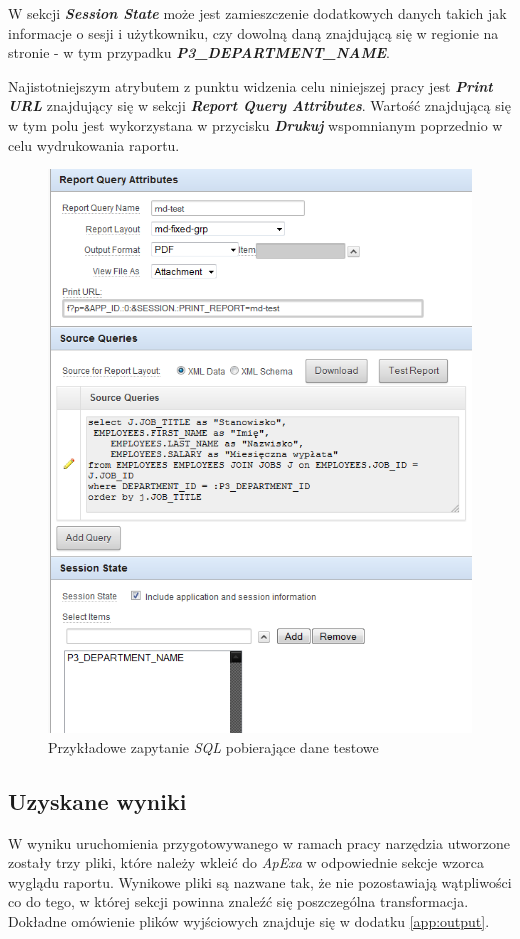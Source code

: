 \documentclass[11pt,a4paper]{article}
\begin{document}
W sekcji \textbf{\emph{Session State}} może jest zamieszczenie dodatkowych danych takich jak informacje o sesji i użytkowniku, czy dowolną daną znajdującą się w regionie na stronie - w tym przypadku \textbf{\emph{P3\_DEPARTMENT\_NAME}}. 

Najistotniejszym atrybutem z punktu widzenia celu niniejszej pracy jest \textbf{\emph{Print URL}} znajdujący się w sekcji \textbf{\emph{Report Query Attributes}}. Wartość znajdującą się w tym polu jest wykorzystana w przycisku \textbf{\emph{Drukuj}} wspomnianym poprzednio w celu wydrukowania raportu.

\begin{figure}
\centering
\includegraphics[scale=0.9]{query}
\caption{Przykładowe zapytanie \emph{SQL} pobierające dane testowe}
\label{img:query}
\end{figure}


\subsection{Uzyskane wyniki} \label{test:result}
W wyniku uruchomienia przygotowywanego w ramach pracy narzędzia utworzone zostały trzy pliki, które należy wkleić do \emph{ApExa} w odpowiednie sekcje wzorca wyglądu raportu. Wynikowe pliki są nazwane tak, że nie pozostawiają wątpliwości co do tego, w której sekcji powinna znaleźć się poszczególna transformacja. Dokładne omówienie plików wyjściowych znajduje się w dodatku \ref{app:output}.
\end{document}
